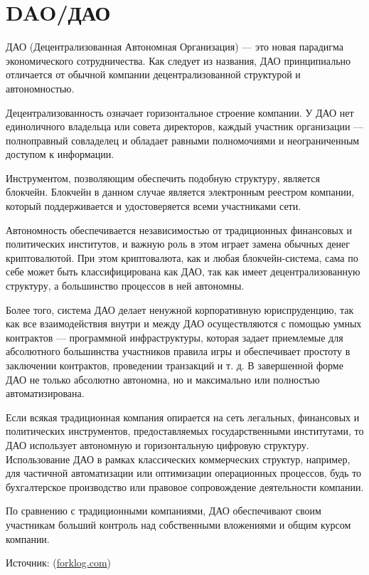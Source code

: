 \documentclass[a4paper,12pt]{report}
\begin{document}
\section{DAO/ДАО}
\label{dao}

ДАО (Децентрализованная Автономная Организация) — это новая парадигма экономического сотрудничества. Как следует из названия, ДАО принципиально отличается от обычной компании децентрализованной структурой и автономностью.

Децентрализованность означает горизонтальное строение компании. У ДАО нет единоличного владельца или совета директоров, каждый участник организации — полноправный совладелец и обладает равными полномочиями и неограниченным доступом к информации.

Инструментом, позволяющим обеспечить подобную структуру, является блокчейн. Блокчейн в данном случае является электронным реестром компании, который поддерживается и удостоверяется всеми участниками сети.

Автономность обеспечивается независимостью от традиционных финансовых и политических институтов, и важную роль в этом играет замена обычных денег криптовалютой. При этом криптовалюта, как и любая блокчейн-система, сама по себе может быть классифицирована как ДАО, так как имеет децентрализованную структуру, а большинство процессов в ней автономны.

Более того, система ДАО делает ненужной корпоративную юриспруденцию, так как все взаимодействия внутри и между ДАО осуществляются с помощью умных контрактов — программной инфраструктуры, которая задает приемлемые для абсолютного большинства участников правила игры и обеспечивает простоту в заключении контрактов, проведении транзакций и т. д. В завершенной форме ДАО не только абсолютно автономна, но и максимально или полностью автоматизирована.

Если всякая традиционная компания опирается на сеть легальных, финансовых и политических инструментов, предоставляемых государственными институтами, то ДАО использует автономную и горизонтальную цифровую структуру. Использование ДАО в рамках классических коммерческих структур, например, для частичной автоматизации или оптимизации операционных процессов, будь то бухгалтерское производство или правовое сопровождение деятельности компании.

По сравнению с традиционными компаниями, ДАО обеспечивают своим участникам больший контроль над собственными вложениями и общим курсом компании. 

Источник: (\href{https://forklog.com/chto-takoe-detsentralizovannye-avtonomnye-organizatsii-i-zachem-oni-nuzhny/}{forklog.com})
\end{document}
